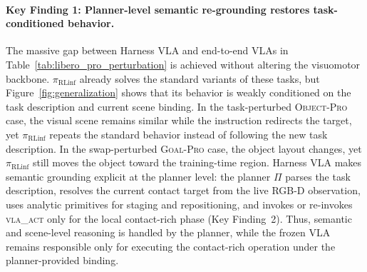 \documentclass[11pt]{article}
\newcommand{\piRLinf}{\pi_{\mathrm{RLinf}}}
\begin{document}
\paragraph{Key Finding 1: Planner-level semantic re-grounding restores task-conditioned behavior.}
The massive gap between Harness VLA and end-to-end VLAs in Table~\ref{tab:libero_pro_perturbation} is achieved without altering the visuomotor backbone. $\piRLinf$ already solves the standard variants of these tasks, but Figure~\ref{fig:generalization} shows that its behavior is weakly conditioned on the task description and current scene binding. In the task-perturbed \textsc{Object-Pro} case, the visual scene remains similar while the instruction redirects the target, yet $\piRLinf$ repeats the standard behavior instead of following the new task description. In the swap-perturbed \textsc{Goal-Pro} case, the object layout changes, yet $\piRLinf$ still moves the object toward the training-time region. Harness VLA makes semantic grounding explicit at the planner level: the planner $\Pi$ parses the task description, resolves the current contact target from the live RGB-D observation, uses analytic primitives for staging and repositioning, and invokes or re-invokes \textsc{vla\_act} only for the local contact-rich phase (Key Finding~2). Thus, semantic and scene-level reasoning is handled by the planner, while the frozen VLA remains responsible only for executing the contact-rich operation under the planner-provided binding.
\end{document}

